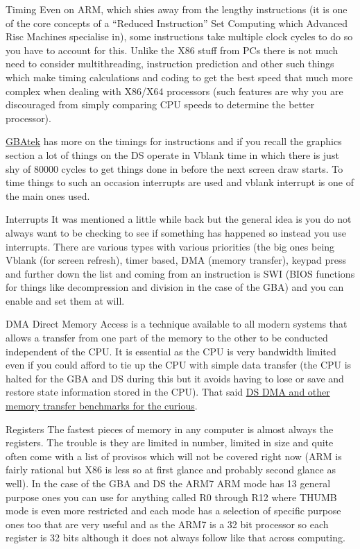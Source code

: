 \documentclass[
]{book}
\begin{document}
Timing Even on ARM, which shies away from the lengthy instructions (it is one of the core concepts of a ``Reduced Instruction'' Set Computing which Advanced Risc Machines specialise in), some instructions take multiple clock cycles to do so you have to account for this. Unlike the X86 stuff from PCs there is not much need to consider multithreading, instruction prediction and other such things which make timing calculations and coding to get the best speed that much more complex when dealing with X86/X64 processors (such features are why you are discouraged from simply comparing CPU speeds to determine the better processor).

\href{http://problemkaputt.de/gbatek.htm\#cpuinstructioncycletimes}{GBAtek} has more on the timings for instructions and if you recall the graphics section a lot of things on the DS operate in Vblank time in which there is just shy of 80000 cycles to get things done in before the next screen draw starts. To time things to such an occasion interrupts are used and vblank interrupt is one of the main ones used.

Interrupts It was mentioned a little while back but the general idea is you do not always want to be checking to see if something has happened so instead you use interrupts. There are various types with various priorities (the big ones being Vblank (for screen refresh), timer based, DMA (memory transfer), keypad press and further down the list and coming from an instruction is SWI (BIOS functions for things like decompression and division in the case of the GBA) and you can enable and set them at will.

DMA Direct Memory Access is a technique available to all modern systems that allows a transfer from one part of the memory to the other to be conducted independent of the CPU. It is essential as the CPU is very bandwidth limited even if you could afford to tie up the CPU with simple data transfer (the CPU is halted for the GBA and DS during this but it avoids having to lose or save and restore state information stored in the CPU). That said \href{http://drunkencoders.com/2013/03/some-memory-benchmarks/}{DS DMA and other memory transfer benchmarks for the curious}.

Registers The fastest pieces of memory in any computer is almost always the registers. The trouble is they are limited in number, limited in size and quite often come with a list of provisos which will not be covered right now (ARM is fairly rational but X86 is less so at first glance and probably second glance as well). In the case of the GBA and DS the ARM7 ARM mode has 13 general purpose ones you can use for anything called R0 through R12 where THUMB mode is even more restricted and each mode has a selection of specific purpose ones too that are very useful and as the ARM7 is a 32 bit processor so each register is 32 bits although it does not always follow like that across computing.
\end{document}
